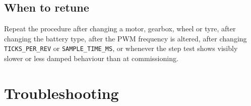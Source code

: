 \documentclass[11pt,a4paper]{report}
\newcommand{\code}[1]{\texttt{#1}}
\begin{document}
\section{When to retune}
Repeat the procedure after changing a motor, gearbox, wheel or tyre, after changing the battery type, after the PWM frequency is altered, after changing \code{TICKS\_PER\_REV} or \code{SAMPLE\_TIME\_MS}, or whenever the step test shows visibly slower or less damped behaviour than at commissioning.

\chapter{Troubleshooting}
\end{document}
